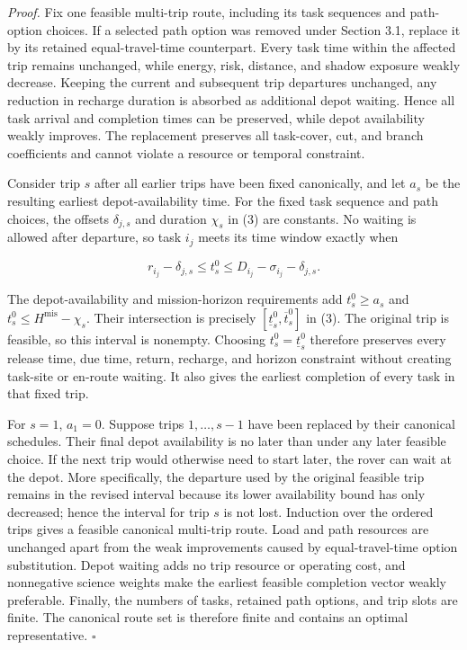 \documentclass[
  11pt,
]{article}
\begin{document}
\emph{Proof.} Fix one feasible multi-trip route, including its task
sequences and path-option choices. If a selected path option was removed
under Section 3.1, replace it by its retained equal-travel-time
counterpart. Every task time within the affected trip remains unchanged,
while energy, risk, distance, and shadow exposure weakly decrease.
Keeping the current and subsequent trip departures unchanged, any
reduction in recharge duration is absorbed as additional depot waiting.
Hence all task arrival and completion times can be preserved, while
depot availability weakly improves. The replacement preserves all
task-cover, cut, and branch coefficients and cannot violate a resource
or temporal constraint.

Consider trip \(s\) after all earlier trips have been fixed canonically,
and let \(a_s\) be the resulting earliest depot-availability time. For
the fixed task sequence and path choices, the offsets \(\delta_{j,s}\)
and duration \(\chi_s\) in (3) are constants. No waiting is allowed
after departure, so task \(i_j\) meets its time window exactly when

\[
r_{i_j}-\delta_{j,s}
\le t_s^0
\le D_{i_j}-\sigma_{i_j}-\delta_{j,s}.
\]

The depot-availability and mission-horizon requirements add
\(t_s^0\ge a_s\) and \(t_s^0\le H^{\mathrm{mis}}-\chi_s\). Their
intersection is precisely \([\underline t_s^0,\overline t_s^0]\) in (3).
The original trip is feasible, so this interval is nonempty. Choosing
\(t_s^0=\underline t_s^0\) therefore preserves every release time, due
time, return, recharge, and horizon constraint without creating
task-site or en-route waiting. It also gives the earliest completion of
every task in that fixed trip.

For \(s=1\), \(a_1=0\). Suppose trips \(1,\ldots,s-1\) have been
replaced by their canonical schedules. Their final depot availability is
no later than under any later feasible choice. If the next trip would
otherwise need to start later, the rover can wait at the depot. More
specifically, the departure used by the original feasible trip remains
in the revised interval because its lower availability bound has only
decreased; hence the interval for trip \(s\) is not lost. Induction over
the ordered trips gives a feasible canonical multi-trip route. Load and
path resources are unchanged apart from the weak improvements caused by
equal-travel-time option substitution. Depot waiting adds no trip
resource or operating cost, and nonnegative science weights make the
earliest feasible completion vector weakly preferable. Finally, the
numbers of tasks, retained path options, and trip slots are finite. The
canonical route set is therefore finite and contains an optimal
representative. \(\square\)
\end{document}
